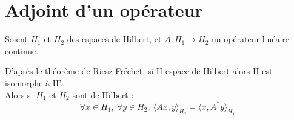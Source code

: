 \section{Adjoint d'un opérateur}
Soient $H_1$ et $H_2$ des espaces de Hilbert, et $A:H_1\to H_2$ un opérateur linéaire continue.


D'après le théorème de Riesz-Fréchet, si H espace de Hilbert alors H est isomorphe à H'.\\
Alors si $H_1$ et $H_2$ sont de Hilbert :
\[\forall x\in H_1,\ \forall y\in H_2,\ \langle Ax,y\rangle_{H_2}=\langle x,A^*y\rangle_{H_1}\]


